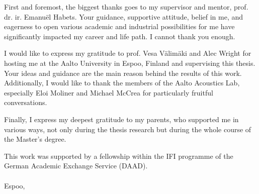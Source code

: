 First and foremost, the biggest thanks goes to my supervisor and mentor, prof. dr. ir. Emanu{\"e}l Habets. Your guidance, supportive attitude, belief in me, and eagerness to open various academic and industrial possibilities for me have significantly impacted my career and life path. I cannot thank you enough.

I would like to express my gratitude to prof. Vesa V{\"a}lim{\"a}ki and Alec Wright for hosting me at the Aalto University in Espoo, Finland and supervising this thesis. Your ideas and guidance are the main reason behind the results of this work. Additionally, I would like to thank the members of the Aalto Acoustics Lab, especially Eloi Moliner and Michael McCrea for particularly fruitful conversations.

Finally, I express my deepest gratitude to my parents, who supported me in various ways, not only during the thesis research but during the whole course of the Master's degree.

This work was supported by a
fellowship within the IFI programme of the German Academic Exchange
Service (DAAD).
\\
\\

Espoo, \myTime \\
\begin{flushright}
    \myName
\end{flushright}


\clearpage